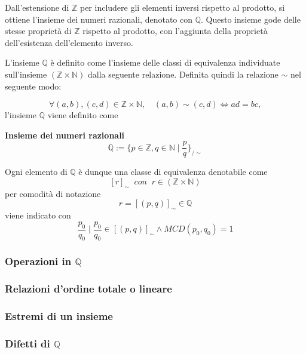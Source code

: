 Dall'estensione di $\mathbb{Z}$ per includere gli elementi inversi rispetto al prodotto,
si ottiene l'insieme dei numeri razionali, denotato con $\mathbb{Q}$.
Questo insieme gode delle stesse proprietà di $\mathbb{Z}$ rispetto al prodotto,
con l'aggiunta della proprietà dell'esistenza dell'elemento inverso.

L'insieme $\mathbb{Q}$ è definito come l'insieme delle classi di equivalenza individuate
sull'insieme $(\mathbb{Z} \times \mathbb{N})$ dalla seguente relazione.
Definita quindi la relazione $\sim$ nel seguente modo:

\[
    \forall (a, b), (c, d) \in \mathbb{Z} \times \mathbb{N}, \quad (a, b) \sim (c, d) \iff ad = bc,
\]
l'insieme $\mathbb{Q}$ viene definito come

\begin{definition}
    \textbf{Insieme dei numeri razionali}
\[
    \mathbb{Q} := \{p \in \mathbb{Z}, q \in \mathbb{N} \mid \frac{p}{q}\}_{/\sim}
\]
\end{definition}

Ogni elemento di $\mathbb{Q}$ è dunque una classe di equivalenza denotabile come
\[
    \left[r\right]_\sim \; \; con \; \; r \in (\mathbb{Z} \times \mathbb{N})
\]
per comodità di notazione
\[
    r = \left[ \left( p , q \right) \right]_\sim \in \mathbb{Q}
\]
viene indicato con 
\[
    \frac{p_0}{q_0} \mid \frac{p_0}{q_0} \in \left[ \left( p , q \right) \right]_\sim  \land MCD(p_0, q_0) = 1
\]

\subsubsection{Operazioni in $\mathbb{Q}$}



\subsubsection{Relazioni d'ordine totale o lineare}



\subsubsection{Estremi di un insieme}




\subsubsection{Difetti di $\mathbb{Q}$}

